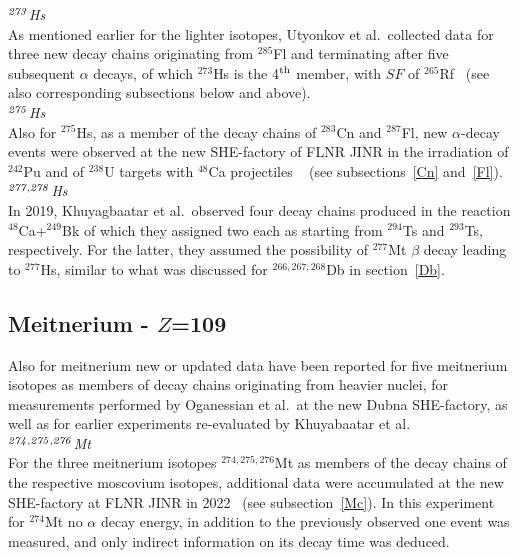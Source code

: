{\it $^{\it273}$Hs}\\
As mentioned earlier for the lighter isotopes, Utyonkov et al.~collected data for three new decay chains originating from $^{285}$Fl and terminating after five subsequent $\alpha$ decays, of which $^{273}$Hs is the 4$^{\rm th}$ member, with $SF$ of $^{265}$Rf~\cite{Utyonkov2018} (see also corresponding subsections below and above).\\

{\it $^{\it275}$Hs}\\
Also for $^{275}$Hs, as a member of the decay chains of $^{283}$Cn and $^{287}$Fl, new $\alpha$-decay events were observed at the new SHE-factory of FLNR JINR in the irradiation of $^{242}$Pu and of $^{238}$U targets with $^{48}$Ca projectiles ~\cite{Oganessian2022b} (see subsections~\ref{Cn} and~\ref{Fl}).\\

{\it $^{\it277,278}$Hs}\\
In 2019, Khuyagbaatar et al.~observed four decay chains produced in the reaction $^{48}$Ca+$^{249}$Bk of which they assigned two each as starting from $^{294}$Ts and $^{293}$Ts, respectively. For the latter, they assumed the possibility of $^{277}$Mt $\beta$ decay leading to $^{277}$Hs, similar to what was discussed for $^{266,267,268}$Db in section~\ref{Db}.




\subsection{Meitnerium - $Z$=109}\label{Mt}

Also for meitnerium new or updated data have been reported for five meitnerium isotopes as members of decay chains originating from heavier nuclei, for measurements performed by Oganessian et al.~at the new Dubna SHE-factory, as well as for earlier experiments re-evaluated by Khuyabaatar et al.\\

{\it $^{\it274,275,276}$Mt}\\
For the three meitnerium isotopes $^{274,275,276}$Mt as members of the decay chains of the respective moscovium isotopes, additional data were accumulated at the new SHE-factory at FLNR JINR in 2022~\cite{Oganessian2022d} (see subsection~\ref{Mc}). In this experiment for $^{274}$Mt no $\alpha$ decay energy, in addition to the previously observed one event was measured, and only indirect information on its decay time was deduced.\\

